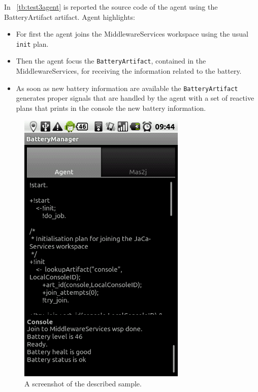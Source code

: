 \documentclass[11pt]{report}
\newcommand\xt[1]{\tablename~\ref{tb:#1}}
\newcommand\code[1]{{\mbox{\texttt{{#1}}}}}
\begin{document}
In \xt{test3agent} is reported the source code of the agent using the \mbox{\textsf{BatteryArtifact}} artifact. Agent highlights:
\begin{itemize}
%
\item For first the agent joins the \textsf{MiddlewareServices} workspace using the usual \code{init} plan.
%
\item Then the agent focus the \code{BatteryArtifact}, contained in the \mbox{\textsf{MiddlewareServices}}, for receiving the information related to the battery.
%
\item As soon as new battery information are available the \code{BatteryArtifact} generates proper signals that are handled by the agent with a set of reactive plans that prints in the console the new battery information.
\end{itemize}

\clearpage
\begin{figure}[h!]
\begin{center}
\includegraphics[width=8cm]{images/test_battery_gui.png}
\end{center}
\caption{A screenshot of the described sample.}
\end{figure}
\clearpage
\end{document}
